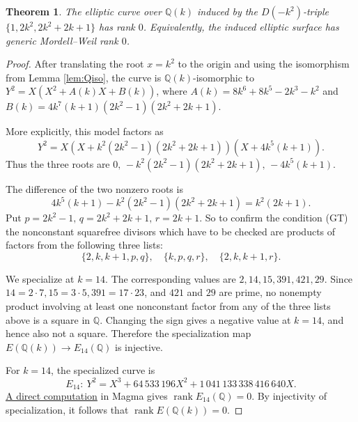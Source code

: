 \documentclass[10pt,a4paper]{amsart}
\newtheorem{theorem}{Theorem}
\newcommand{\Q}{\mathbb{Q}}
\begin{document}
\begin{theorem}
The elliptic curve over \(\Q(k)\) induced by the
\(D(-k^2)\)-triple \(\{1,2k^2,2k^2+2k+1\}\) has rank \(0\).
Equivalently, the induced elliptic surface has generic Mordell--Weil rank \(0\).
\end{theorem}

\begin{proof}
After translating the root \(x=k^2\) to the origin and using the isomorphism from
Lemma \ref{lem:Qiso}, the curve is \(\Q(k)\)-isomorphic to
\(Y^2=X(X^2+A(k)X+B(k))\), where
\(A(k)=8k^6+8k^5-2k^3-k^2\) and
\(B(k)=4k^7(k+1)(2k^2-1)(2k^2+2k+1)\).

More explicitly, this model factors as
\[
Y^2=X(X+k^2(2k^2-1)(2k^2+2k+1))(X+4k^5(k+1)).
\]
Thus the three roots are
\( 0,\, -k^2(2k^2-1)(2k^2+2k+1), \, -4k^5(k+1)\).

The difference of the two nonzero roots is
\[
4k^5(k+1)-k^2(2k^2-1)(2k^2+2k+1)=k^2(2k+1).
\]
Put
\( p=2k^2-1,\, q=2k^2+2k+1,\, r=2k+1\).
So to confirm the condition (GT) the nonconstant squarefree divisors which have to be checked are products
of factors from the following three lists:
\[
\{2,k,k+1,p,q\},\quad \{k,p,q,r\},\quad \{2,k,k+1,r\}.
\]

We specialize at \(k=14\). The corresponding values are
\( 2, 14, 15, 391, 421, 29 \).
Since
\( 14=2\cdot 7, 15=3\cdot 5, 391=17\cdot 23\),
and \(421\) and \(29\) are prime, no nonempty product involving at least one
nonconstant factor from any of the three lists above is a square in \(\Q\).
Changing the sign gives a negative value at \(k=14\), and hence also not a square.
Therefore the specialization map
\( E(\Q(k))\to E_{14}(\Q) \)
is injective.

For \(k=14\), the specialized curve is
\[
E_{14}:\ Y^2=X^3+64\,533\,196X^2+1\,041\,133\,338\,416\,640X.
\]
\href{https://github.com/NikolaAdzaga/TorsionRegularTriples/blob/main/generic_rank_0.m}{A direct computation} in {\sc Magma} gives
\(\operatorname{rank} E_{14}(\Q)=0\). By injectivity of specialization,
it follows that \(\operatorname{rank} E(\Q(k))=0\).
\end{proof}
\end{document}
